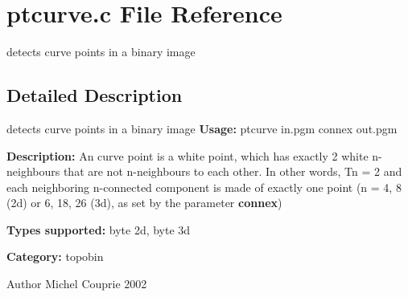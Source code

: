 \section{ptcurve.c File Reference}
\label{ptcurve_8c}


detects curve points in a binary image  




\subsection{Detailed Description}
detects curve points in a binary image {\bfseries Usage:} ptcurve in.pgm connex out.pgm

{\bfseries Description:} An curve point is a white point, which has exactly 2 white n-\/neighbours that are not n-\/neighbours to each other. In other words, Tn = 2 and each neighboring n-\/connected component is made of exactly one point (n = 4, 8 (2d) or 6, 18, 26 (3d), as set by the parameter {\bfseries connex})

{\bfseries Types supported:} byte 2d, byte 3d

{\bfseries Category:} topobin

\begin{DoxyAuthor}{Author}
Michel Couprie 2002 
\end{DoxyAuthor}
